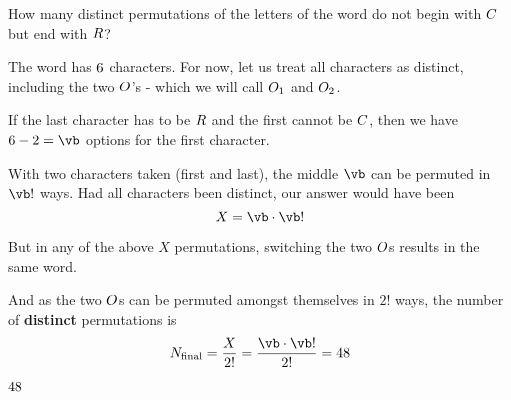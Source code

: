 



\SUBTRACT{}\vo
\SUBTRACT{}\vb

\question How many distinct permutations of the letters of the word \text{\vw } do not begin with $C$ but end with $R$?

\watchout

\begin{solution}
  The word \text{\vw } has $6$ characters. For now, let us treat all characters as distinct, 
  including the two $O$'s - which we will call $O_1$ and $O_2$.

  If the last character has to be $R$ and the first cannot be $C$, then we 
  have $\vn-2=\vb$ options for the first character. 

  With two characters taken (first and last), the middle $\vb$ can be permuted in $\vb !$ ways. 
  Had all characters been distinct, our answer would have been 
  \[ X = \vb\cdot\vb ! \]

  But in any of the above $X$ permutations, switching the two $O$s results in the same word. 

  And as the two $O$s can be permuted amongst themselves in $2!$ ways, the number of \textbf{distinct} permutations is 
  \[ N_{\text{final}} = \dfrac{X}{2!} = \dfrac{\vb\cdot\vb!}{2!} = \vz \] 
\end{solution}


\ifprintanswers\begin{codex}$48$\end{codex}\fi
